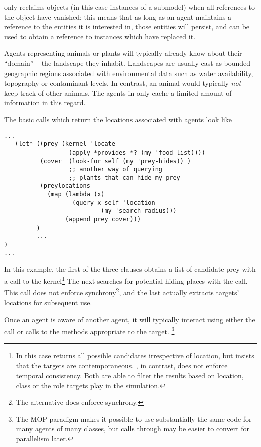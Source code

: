 \Scheme only reclaims objects (in this case instances of a submodel)
when all references to the object have vanished; this means that as
long as an agent maintains a reference to the entities it is
interested in, those entities will persist, and can be used to obtain
a reference to instances which have replaced it.

Agents representing animals or plants will typically already know
about their ``domain'' -- the landscape they inhabit.  Landscapes are
usually cast as bounded geographic regions associated with
environmental data such as water availability, topography or
contaminant levels. In contrast, an animal would typically \emph{not}
keep track of other animals.  The agents in \ReModel only
cache a limited amount of information in this regard.

The basic calls which return the locations associated with agents look
like
\begin{verbatim}
...
   (let* ((prey (kernel 'locate 
                  (apply *provides-*? (my 'food-list))))
          (cover  (look-for self (my 'prey-hides)) ) 
                  ;; another way of querying
                  ;; plants that can hide my prey
          (preylocations 
            (map (lambda (x) 
                   (query x self 'location 
                           (my 'search-radius))) 
                 (append prey cover)))
         )
         ...
)
...
\end{verbatim}
In this example, the first of the three clauses obtains a list of
candidate prey with a call to the kernel\footnote{In this case
   returns all possible candidates irrespective of
  location, but insists that the targets are
  contemporaneous. , in contrast, does not enforce
  temporal consistency. Both are able to filter the results based on
  location, class or the role targets play in the simulation.}  The
next searches for potential hiding places with the 
call. This call does not enforce synchrony\footnote{The alternative
   does enforce synchrony.}, and the last actually
extracts targets' locations for subsequent use.

Once an agent is aware of another agent, it will typically interact
using either the  call or calls to the methods
appropriate to the target. \footnote{The MOP paradigm makes it possible to use
substantially the same code for many agents of many classes, but calls
through  may be easier to convert for parallelism later.}


